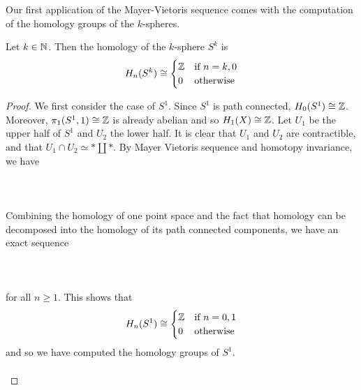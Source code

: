 \documentclass[a4paper]{article}
\begin{document}
Our first application of the Mayer-Vietoris sequence comes with the computation of the homology groups of the $k$-spheres. 

\begin{thm}{}{} Let $k\in\mathbb{N}$. Then the homology of the $k$-sphere $S^k$ is $$H_n(S^k)\cong\begin{cases}
\mathbb{Z} & \text{if } n=k,0\\
0 & \text{otherwise}
\end{cases}$$ \tcbline
\begin{proof}
We first consider the case of $S^1$. Since $S^1$ is path connected, $H_0(S^1)\cong\mathbb{Z}$. Moreover, $\pi_1(S^1,1)\cong\mathbb{Z}$ is already abelian and so $H_1(X)\cong\mathbb{Z}$. Let $U_1$ be the upper half of $S^1$ and $U_2$ the lower half. It is clear that $U_1$ and $U_2$ are contractible, and that $U_1\cap U_2\simeq\ast\amalg\ast$. By Mayer Vietoris sequence and homotopy invariance, we have \\~\\
\\~\\
Combining the homology of one point space and the fact that homology can be decomposed into the homology of its path connected components, we have an exact sequence \\~\\
\\~\\
for all $n\geq 1$. This shows that $$H_n(S^1)\cong\begin{cases}
\mathbb{Z} & \text{if } n=0,1\\
0 & \text{otherwise}
\end{cases}$$ and so we have computed the homology groups of $S^1$. \\~\\


\end{proof}
\end{thm}
\end{document}
